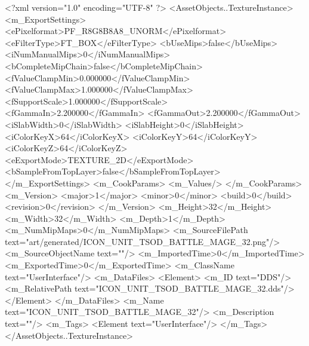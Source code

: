 <?xml version="1.0" encoding="UTF-8" ?>
<AssetObjects..TextureInstance>
	<m_ExportSettings>
		<ePixelformat>PF_R8G8B8A8_UNORM</ePixelformat>
		<eFilterType>FT_BOX</eFilterType>
		<bUseMips>false</bUseMips>
		<iNumManualMips>0</iNumManualMips>
		<bCompleteMipChain>false</bCompleteMipChain>
		<fValueClampMin>0.000000</fValueClampMin>
		<fValueClampMax>1.000000</fValueClampMax>
		<fSupportScale>1.000000</fSupportScale>
		<fGammaIn>2.200000</fGammaIn>
		<fGammaOut>2.200000</fGammaOut>
		<iSlabWidth>0</iSlabWidth>
		<iSlabHeight>0</iSlabHeight>
		<iColorKeyX>64</iColorKeyX>
		<iColorKeyY>64</iColorKeyY>
		<iColorKeyZ>64</iColorKeyZ>
		<eExportMode>TEXTURE_2D</eExportMode>
		<bSampleFromTopLayer>false</bSampleFromTopLayer>
	</m_ExportSettings>
	<m_CookParams>
		<m_Values/>
	</m_CookParams>
	<m_Version>
		<major>1</major>
		<minor>0</minor>
		<build>0</build>
		<revision>0</revision>
	</m_Version>
	<m_Height>32</m_Height>
	<m_Width>32</m_Width>
	<m_Depth>1</m_Depth>
	<m_NumMipMaps>0</m_NumMipMaps>
	<m_SourceFilePath text="art/generated/ICON_UNIT_TSOD_BATTLE_MAGE_32.png"/>
	<m_SourceObjectName text=""/>
	<m_ImportedTime>0</m_ImportedTime>
	<m_ExportedTime>0</m_ExportedTime>
	<m_ClassName text="UserInterface"/>
	<m_DataFiles>
		<Element>
			<m_ID text="DDS"/>
			<m_RelativePath text="ICON_UNIT_TSOD_BATTLE_MAGE_32.dds"/>
		</Element>
	</m_DataFiles>
	<m_Name text="ICON_UNIT_TSOD_BATTLE_MAGE_32"/>
	<m_Description text=""/>
	<m_Tags>
		<Element text="UserInterface"/>
	</m_Tags>
</AssetObjects..TextureInstance>
